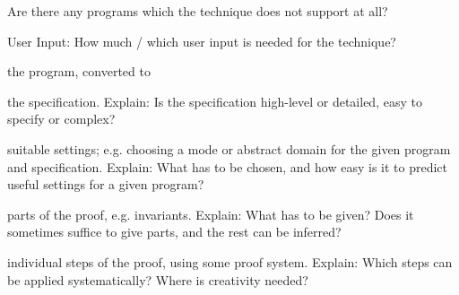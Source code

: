 \documentclass[a4paper]{article}
\begin{document}
\begin{minipage}[t]{0.16\linewidth}
\begin{betterlist}
\begin{betterlist}
\begin{betterlist}
			\end{betterlist}
			\item Are there any programs which the technique does not support at all?

		\end{betterlist}
		\item \alert{User Input:} How much / which user input is needed for the technique?
		\begin{betterlist}
			\item \checkboxChecked the program, converted to

			\item \checkboxHalfChecked the specification. Explain: Is the specification high-level or detailed, easy to specify or complex?

			\item \checkboxUnchecked suitable settings; e.g. choosing a mode or abstract domain for the given program and specification. Explain: What has to be chosen, and how easy is it to predict useful settings for a given program?

			\item \checkboxUnchecked parts of the proof, e.g. invariants. Explain: What has to be given? Does it sometimes suffice to give parts, and the rest can be inferred?

			\item \checkboxUnchecked individual steps of the proof, using some proof system. Explain: Which steps can be applied systematically? Where is creativity needed?


\end{betterlist}
\end{betterlist}
\end{minipage}
\end{document}
